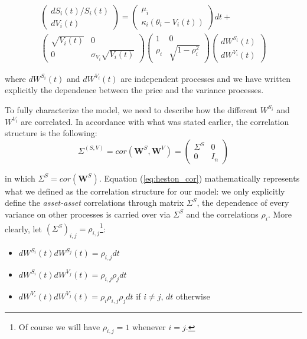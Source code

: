  \begin{multline}
\begin{pmatrix}
	dS_i(t) / S_i(t)\\
	dV_i(t)
\end{pmatrix}
= \begin{pmatrix}
\mu_i\\
\kappa_i (\theta_i - V_i(t))
\end{pmatrix}
dt  +\\ \begin{pmatrix}
\sqrt{V_i(t)} & 0 \\
0 & \sigma_{V_i} \sqrt{V_i(t)} 
\end{pmatrix}
\begin{pmatrix}
1 & 0 \\
 \rho_i & \sqrt{1-\rho_i^2} 
\end{pmatrix}
\begin{pmatrix}
dW^{S_i}(t)\\
dW^{V_i }(t)
\end{pmatrix}
\end{multline}

where $dW^{S_i}(t)$ and $dW^{V_i}(t)$ are independent processes and we have written explicitly the dependence between the price and the variance processes.

To fully characterize the model, we need to describe how the different $W^{S_i}$ and $W^{V_i}$ are correlated. In accordance with what was stated earlier, the correlation structure is the following:
\begin{equation}
\label{eq:heston_cor}
\Sigma^{(S,V)} = cor(\boldsymbol{W}^{S}, \boldsymbol{W}^{V}) = \begin{pmatrix}
\Sigma^{S} & 0 \\
0& I_n
\end{pmatrix}
\end{equation}

in which $\Sigma^S = cor(\boldsymbol{W}^{S})$.
Equation (\ref{eq:heston_cor}) mathematically represents what we defined as the correlation structure for our model: we only explicitly define the \textit{asset-asset} correlations through matrix $\Sigma^S$, the dependence of every variance  on other processes is carried over via $\Sigma^S$ and the correlations $\rho_i$.
More clearly, let $(\Sigma^S)_{i,j} = \rho_{i,j}$\footnote{Of course we will have $\rho_{i,j} = 1 $ whenever $i=j$.}:
\begin{itemize}
	\item $dW^{S_i}(t) dW^{S_j}(t) = \rho_{i,j} dt$
	\item $dW^{S_i}(t) dW^{V_j}(t) = \rho_{i,j} \rho_j dt$
	\item $dW^{V_i}(t) dW^{V_j}(t) = \rho_i \rho_{i,j}\rho_j dt $ if $i\neq j$, $dt$ otherwise
\end{itemize}

